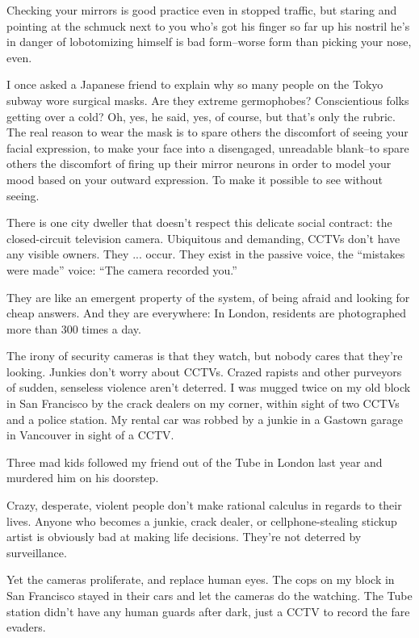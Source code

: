 Checking your mirrors is good practice even in stopped traffic, but
staring and pointing at the schmuck next to you who's got his
finger so far up his nostril he's in danger of lobotomizing himself
is bad form--worse form than picking your nose, even.

I once asked a Japanese friend to explain why so many people on the
Tokyo subway wore surgical masks. Are they extreme germophobes?
Conscientious folks getting over a cold? Oh, yes, he said, yes, of
course, but that's only the rubric. The real reason to wear the
mask is to spare others the discomfort of seeing your facial
expression, to make your face into a disengaged, unreadable
blank--to spare others the discomfort of firing up their mirror
neurons in order to model your mood based on your outward
expression. To make it possible to see without seeing.

There is one city dweller that doesn't respect this delicate social
contract: the closed-circuit television camera. Ubiquitous and
demanding, CCTVs don't have any visible owners. They ... occur.
They exist in the passive voice, the ``mistakes were made'' voice:
``The camera recorded you.''

They are like an emergent property of the system, of being afraid
and looking for cheap answers. And they are everywhere: In London,
residents are photographed more than 300 times a day.

The irony of security cameras is that they watch, but nobody cares
that they're looking. Junkies don't worry about CCTVs. Crazed
rapists and other purveyors of sudden, senseless violence aren't
deterred. I was mugged twice on my old block in San Francisco by
the crack dealers on my corner, within sight of two CCTVs and a
police station. My rental car was robbed by a junkie in a Gastown
garage in Vancouver in sight of a CCTV.

Three mad kids followed my friend out of the Tube in London last
year and murdered him on his doorstep.

Crazy, desperate, violent people don't make rational calculus in
regards to their lives. Anyone who becomes a junkie, crack dealer,
or cellphone-stealing stickup artist is obviously bad at making
life decisions. They're not deterred by surveillance.

Yet the cameras proliferate, and replace human eyes. The cops on my
block in San Francisco stayed in their cars and let the cameras do
the watching. The Tube station didn't have any human guards after
dark, just a CCTV to record the fare evaders.

